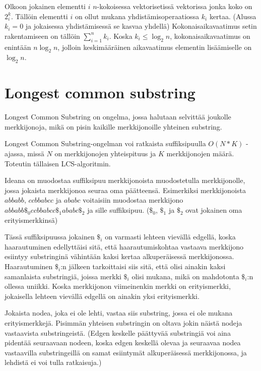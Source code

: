 \documentclass{article}
\begin{document}
    Olkoon jokainen elementti $i$ $n$-kokoisessa vektorisetissä vektorissa jonka koko on $2^k_i$. Tällöin elementti $i$ on ollut mukana
    yhdistämisoperaatiossa $k_i$ kertaa. (Alussa $k_i=0$ ja jokaisessa yhdistämisessä se kasvaa yhdellä) Kokonaisaikavaatimus 
    setin rakentamiseen on tällöin $\sum_{i=1}^n{k_i}$. Koska $k_i\leq \log_2n$, kokonaisaikavaatimus on enintään
    $n\log_2n$, jolloin keskimääräinen aikavaatimus elementin lisäämiselle on $\log_2 n$.

  \newpage
  \section{Longest common substring}
    Longest Common Substring on ongelma, jossa halutaan selvittää joukolle merkkijonoja, mikä on pisin kaikille merkkijonoille
    yhteinen substring.
    
    Longest Common Substring-ongelman voi ratkaista suffiksipuulla $O(N*K)$ -ajassa, missä $N$ on merkkijonojen yhteispituus ja
    $K$ merkkijonojen määrä. Toteutin tällaisen LCS-algoritmin.
    
    Ideana on muodostaa suffiksipuu merkkijonoista muodostetulla merkkijonolle, jossa jokaista merkkijonoa seuraa oma päätteensä.
    Esimerkiksi merkkijonoista $abbabb$, $ccbbabcc$ ja $ababc$ voitaisiin muodostaa merkkijono $abbabb\$_0ccbbabcc\$_1ababc\$_2$
    ja sille suffiksipuu. ($\$_0$, $\$_1$ ja $\$_2$ ovat jokainen oma erityismerkkinsä)
    
    Tässä suffiksipuussa jokainen $\$_i$ on varmasti lehteen vievällä edgellä, koska haarautuminen edellyttäisi sitä, että
    haarautumiskohtaa vastaava merkkijono esiintyy substringinä vähintään kaksi kertaa alkuperäisessä merkkijonossa. Haarautuminen
    $\$_i$:n jälkeen tarkoittaisi siis sitä, että olisi ainakin kaksi samanlaista substringiä, joissa merkki $\$_i$ olisi mukana,
    mikä on mahdotonta $\$_i$:n ollessa uniikki. Koska merkkijonon viimeinenkin merkki on erityismerkki, jokaisella lehteen vievällä
    edgellä on ainakin yksi erityismerkki.
    
    Jokaista nodea, joka ei ole lehti, vastaa siis substring, jossa ei ole mukana erityismerkkejä. Pisimmän yhteisen substringin
    on oltava jokin näistä nodeja vastaavista substringeistä. (Edgen keskelle päättyvää substringiä voi aina pidentää seuraavaan nodeen,
    koska edgen keskellä olevaa ja seuraavaa nodea vastaavilla substringeillä on samat esiintymät alkuperäisessä merkkijonossa, ja
    lehdistä ei voi tulla ratkaisuja.)
    
\end{document}
